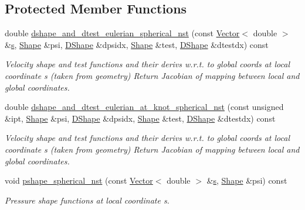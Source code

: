 \subsection*{Protected Member Functions}
\begin{DoxyCompactItemize}
\item 
double \hyperlink{classoomph_1_1QSphericalTaylorHoodElement_ad6ac4efe30e2d18801f17f000db47a25}{dshape\+\_\+and\+\_\+dtest\+\_\+eulerian\+\_\+spherical\+\_\+nst} (const \hyperlink{classoomph_1_1Vector}{Vector}$<$ double $>$ \&\hyperlink{cfortran_8h_ab7123126e4885ef647dd9c6e3807a21c}{s}, \hyperlink{classoomph_1_1Shape}{Shape} \&psi, \hyperlink{classoomph_1_1DShape}{D\+Shape} \&dpsidx, \hyperlink{classoomph_1_1Shape}{Shape} \&test, \hyperlink{classoomph_1_1DShape}{D\+Shape} \&dtestdx) const
\begin{DoxyCompactList}\small\item\em Velocity shape and test functions and their derivs w.\+r.\+t. to global coords at local coordinate s (taken from geometry) Return Jacobian of mapping between local and global coordinates. \end{DoxyCompactList}\item 
double \hyperlink{classoomph_1_1QSphericalTaylorHoodElement_accf74eeba4a63dff1ca12048b751fed2}{dshape\+\_\+and\+\_\+dtest\+\_\+eulerian\+\_\+at\+\_\+knot\+\_\+spherical\+\_\+nst} (const unsigned \&ipt, \hyperlink{classoomph_1_1Shape}{Shape} \&psi, \hyperlink{classoomph_1_1DShape}{D\+Shape} \&dpsidx, \hyperlink{classoomph_1_1Shape}{Shape} \&test, \hyperlink{classoomph_1_1DShape}{D\+Shape} \&dtestdx) const
\begin{DoxyCompactList}\small\item\em Velocity shape and test functions and their derivs w.\+r.\+t. to global coords at local coordinate s (taken from geometry) Return Jacobian of mapping between local and global coordinates. \end{DoxyCompactList}\item 
void \hyperlink{classoomph_1_1QSphericalTaylorHoodElement_acc55b6f8430df47195e31d8e8e6b68c0}{pshape\+\_\+spherical\+\_\+nst} (const \hyperlink{classoomph_1_1Vector}{Vector}$<$ double $>$ \&\hyperlink{cfortran_8h_ab7123126e4885ef647dd9c6e3807a21c}{s}, \hyperlink{classoomph_1_1Shape}{Shape} \&psi) const
\begin{DoxyCompactList}\small\item\em Pressure shape functions at local coordinate s. \end{DoxyCompactList}\item 

\end{DoxyCompactItemize}
